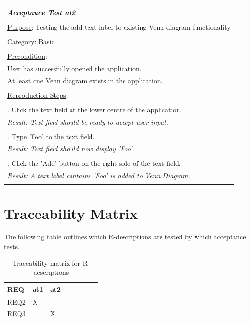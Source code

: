 \documentclass[fontsize=12pt,paper=letter,twoside]{scrartcl}
\begin{document}
\newpage

\begin{table}[!h]
	\begin{tabular}{|l|}
		\hline
		\\
		\textbf{\emph{Acceptance Test at2}} 	
		\\\\
		\underline{Purpose}: Testing the add text label to existing Venn diagram functionality \\
		\\
		\underline{Category}: Basic		\\
		\\
		\underline{Precondition}:															\\ \qquad
		User has successfully opened the application.
		\\ \qquad
		At least one Venn diagram exists in the application.
		\\\\
		\underline{Reproduction Steps}:				
		\\\\ \qquad 1. Click the text field at the lower centre of the application.
		\\ \qquad \textit{Result: Text field should be ready to accept user input.} 
		\\\\ \qquad 2. Type 'Foo' to the text field.
		\\ \qquad \textit{Result: Text field should now display 'Foo'.} 
		\\\\ \qquad 3. Click the 'Add' button on the right side of the text field.
		\\ \qquad \textit{Result: A text label contains 'Foo' is added to Venn Diagram.} 
		\\\\
		\hline
	\end{tabular}
\end{table}

\newpage
\section{Traceability Matrix}

The following table outlines which R-descriptions are tested by which acceptance tests.

\begin{table}[!ht]
	\centering
	\begin{tabular}{|l|l|l|l|l|l|l|l|}
		\hline
		\textbf{REQ} & at1 & at2 \\ \hline
		REQ2         & X   &     \\ \hline
		REQ3         &     & X   \\ \hline
	\end{tabular}
	\caption{Traceability matrix for R-descriptions}
	\label{tbl:at}
\end{table}

\end{document}

